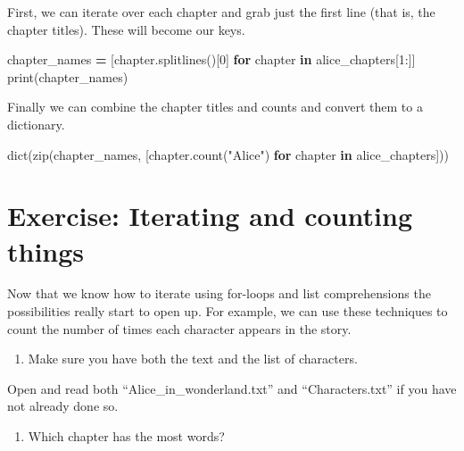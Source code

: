 \documentclass[]{book}
\newenvironment{Shaded}{\begin{snugshade}}{\end{snugshade}}
\newcommand{\KeywordTok}[1]{\textcolor[rgb]{0.13,0.29,0.53}{\textbf{#1}}}
\newcommand{\DecValTok}[1]{\textcolor[rgb]{0.00,0.00,0.81}{#1}}
\newcommand{\StringTok}[1]{\textcolor[rgb]{0.31,0.60,0.02}{#1}}
\newcommand{\ControlFlowTok}[1]{\textcolor[rgb]{0.13,0.29,0.53}{\textbf{#1}}}
\newcommand{\OperatorTok}[1]{\textcolor[rgb]{0.81,0.36,0.00}{\textbf{#1}}}
\newcommand{\BuiltInTok}[1]{#1}
\newcommand{\NormalTok}[1]{#1}
\providecommand{\tightlist}{%
  \setlength{\itemsep}{0pt}\setlength{\parskip}{0pt}}
\begin{document}
First, we can iterate over each chapter and grab just the first line
(that is, the chapter titles). These will become our keys.

\begin{Shaded}
\begin{Highlighting}[]
\NormalTok{chapter_names }\OperatorTok{=}\NormalTok{ [chapter.splitlines()[}\DecValTok{0}\NormalTok{] }\ControlFlowTok{for}\NormalTok{ chapter }\KeywordTok{in}\NormalTok{ alice_chapters[}\DecValTok{1}\NormalTok{:]]}
\BuiltInTok{print}\NormalTok{(chapter_names)}
\end{Highlighting}
\end{Shaded}

Finally we can combine the chapter titles and counts and convert them to
a dictionary.

\begin{Shaded}
\begin{Highlighting}[]
\BuiltInTok{dict}\NormalTok{(}\BuiltInTok{zip}\NormalTok{(chapter_names, }
\NormalTok{         [chapter.count(}\StringTok{"Alice"}\NormalTok{) }
          \ControlFlowTok{for}\NormalTok{ chapter }\KeywordTok{in}\NormalTok{ alice_chapters]))}
\end{Highlighting}
\end{Shaded}

\section{Exercise: Iterating and counting
things}\label{exercise-iterating-and-counting-things}

Now that we know how to iterate using for-loops and list comprehensions
the possibilities really start to open up. For example, we can use these
techniques to count the number of times each character appears in the
story.

\begin{enumerate}
\def\labelenumi{\arabic{enumi}.}
\tightlist
\item
  Make sure you have both the text and the list of characters.
\end{enumerate}

Open and read both ``Alice\_in\_wonderland.txt'' and ``Characters.txt''
if you have not already done so.

\begin{enumerate}
\def\labelenumi{\arabic{enumi}.}
\setcounter{enumi}{1}
\tightlist
\item
  Which chapter has the most words?
\end{enumerate}
\end{document}
